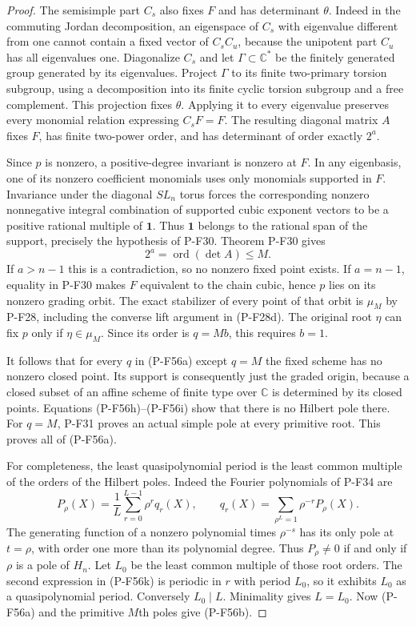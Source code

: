 \begin{proof}
The semisimple part $C_s$ also fixes $F$ and has determinant
$\theta$. Indeed in the commuting Jordan decomposition,
an eigenspace of $C_s$ with eigenvalue different from one
cannot contain a fixed vector of $C_sC_u$, because the
unipotent part $C_u$ has all eigenvalues one.
Diagonalize $C_s$ and let $\Gamma\subset\mathbb C^*$ be
the finitely generated group generated by its eigenvalues.
Project $\Gamma$ to its finite two-primary torsion subgroup,
using a decomposition into its finite cyclic torsion subgroup
and a free complement. This projection fixes $\theta$.
Applying it to every eigenvalue preserves every monomial
relation expressing $C_sF=F$.
The resulting diagonal matrix $A$ fixes $F$, has finite
two-power order, and has determinant of order exactly $2^a$.

Since $p$ is nonzero, a positive-degree invariant is nonzero
at $F$. In any eigenbasis, one of its nonzero coefficient
monomials uses only monomials supported in $F$.
Invariance under the diagonal $SL_n$ torus forces the
corresponding nonzero nonnegative integral combination of supported
cubic exponent vectors to be a positive rational multiple
of $\mathbf1$. Thus $\mathbf1$ belongs to the rational
span of the support, precisely the hypothesis of P-F30.
Theorem P-F30 gives
\[
                       2^a=\operatorname{ord}(\det A)\le M.
 \tag{P-F56j}
\]
If $a>n-1$ this is a contradiction, so no nonzero fixed
point exists. If $a=n-1$, equality in P-F30 makes $F$
equivalent to the chain cubic, hence $p$ lies on its
nonzero grading orbit. The exact stabilizer of every
point of that orbit is $\mu_M$ by P-F28, including the
converse lift argument in (P-F28d).
The original root $\eta$ can fix $p$ only if $\eta\in\mu_M$.
Since its order is $q=Mb$, this requires $b=1$.

It follows that for every $q$ in (P-F56a) except $q=M$
the fixed scheme has no nonzero closed point. Its support
is consequently just the graded origin, because a closed
subset of an affine scheme of finite type over $\mathbb C$
is determined by its closed points. Equations
(P-F56h)--(P-F56i) show that there is no Hilbert pole there.
For $q=M$, P-F31 proves an actual simple pole at every
primitive root. This proves all of (P-F56a).

For completeness, the least quasipolynomial period is the
least common multiple of the orders of the Hilbert poles.
Indeed the Fourier polynomials of P-F34 are
\[
 P_\rho(X)=\frac1L\sum_{r=0}^{L-1}\rho^r q_r(X),\qquad
 q_r(X)=\sum_{\rho^L=1}\rho^{-r}P_\rho(X).                 \tag{P-F56k}
\]
The generating function of a nonzero polynomial times
$\rho^{-s}$ has its only pole at $t=\rho$, with order
one more than its polynomial degree. Thus $P_\rho\ne0$
if and only if $\rho$ is a pole of $H_n$.
Let $L_0$ be the least common multiple of those root orders.
The second expression in (P-F56k) is periodic in $r$
with period $L_0$, so it exhibits $L_0$ as a quasipolynomial
period. Conversely $L_0\mid L$. Minimality gives $L=L_0$.
Now (P-F56a) and the primitive $M$th poles give (P-F56b).


\end{proof}
